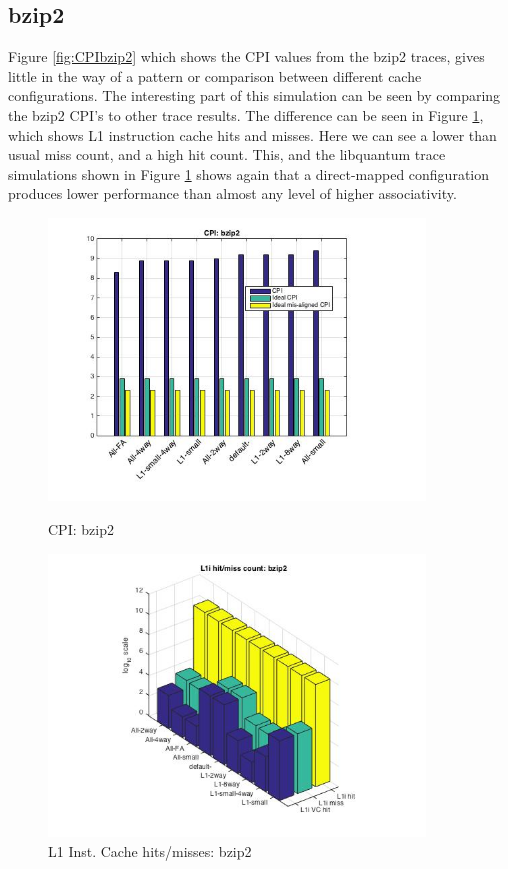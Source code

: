\documentclass[11pt,titlepage]{article}
\begin{document}
    \subsection{bzip2}
    Figure \ref{fig:CPIbzip2} which shows the CPI values from the bzip2 traces, gives little in the way of a pattern or comparison between different cache configurations. The interesting part of this simulation can be seen by comparing the bzip2 CPI's to other trace results. The difference can be seen in Figure \ref{fig:L1IHM_bzip2}, which shows L1 instruction cache hits and misses. Here we can see a lower than usual miss count, and a high hit count. This, and the libquantum trace simulations shown in Figure \ref{fig:L1IHM_bzip2} shows again that a direct-mapped configuration produces lower performance than almost any level of higher associativity.
        \begin{figure}[H]
          \centering
          \begin{minipage}{.5\textwidth}
            \centering
            \includegraphics[width=10cm]{CPIbzip2}
            \caption{CPI: bzip2}
            \label{fig:CPIbzip2}
          \end{minipage}%
          \begin{minipage}{.5\textwidth}
            \centering
            \includegraphics[width=10cm]{L1IHM_bzip2}
            \caption{L1 Inst. Cache hits/misses: bzip2}
            \label{fig:L1IHM_bzip2}
          \end{minipage}%
        \end{figure}
\end{document}

